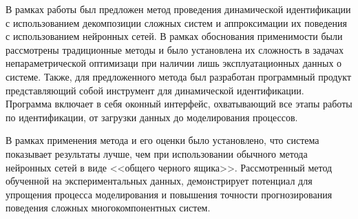 \Conclusion %

В рамках работы был предложен метод проведения динамической идентификации с использованием декомпозиции сложных систем и аппроксимации их поведения с использованием нейронных сетей. В рамках обоснования применимости были рассмотрены традиционные методы и было установлена их сложность в задачах непараметрической оптимизаци при наличии лишь эксплуатационных данных о системе. 
Также, для предложенного метода был разработан программный продукт представляющий собой инструмент для динамической идентификации. Программа включает в себя оконный интерфейс, охватывающий все этапы работы по идентификации, от загрузки данных до моделирования процессов. 

В рамках применения метода и его оценки было установлено, что система показывает результаты лучше, чем при использовании обычного метода нейронных сетей в виде <<общего черного ящика>>. 
Рассмотренный метод обученной на экспериментальных данных, демонстрирует потенциал для упрощения процесса моделирования и повышения точности прогнозирования поведения сложных многокомпонентных систем. 



